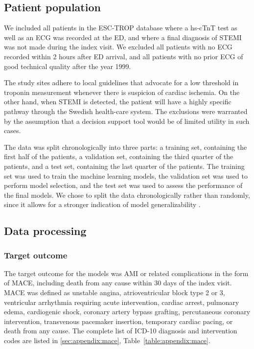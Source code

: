 \documentclass[preprint]{elsarticle}
\begin{document}
\subsection{Patient population}
We included all patients in the ESC-TROP database where a hs-cTnT test as well as an ECG was recorded at the ED, and where a final diagnosis of STEMI was not made during the index visit. We excluded all patients with no ECG recorded within 2 hours after ED arrival, and all patients with no prior ECG of good technical quality after the year 1999.

The study sites adhere to local guidelines that advocate for a low threshold in troponin measurement whenever there is suspicion of cardiac ischemia. On the other hand, when STEMI is detected, the patient will have a highly specific pathway through the Swedish health-care system. The exclusions were warranted by the assumption that a decision support tool would be of limited utility in such cases.

The data was split chronologically into three parts: a training set, containing the first half of the patients, a validation set, containing the third quarter of the patients, and a test set, containing the last quarter of the patients. The training set was used to train the machine learning models, the validation set was used to perform model selection, and the test set was used to assess the performance of the final models. We chose to split the data chronologically rather than randomly, since it allows for a stronger indication of model generalizability \citep{steyerberg2009}.


\subsection{Data processing}
\subsubsection{Target outcome}
The target outcome for the models was AMI or related complications in the form of MACE, including death from any cause within 30 days of the index visit. MACE was defined as unstable angina, atrioventricular block type 2 or 3, ventricular arrhythmia requiring acute intervention, cardiac arrest, pulmonary edema, cardiogenic shock, coronary artery bypass grafting, percutaneous coronary intervention, transvenous pacemaker insertion, temporary cardiac pacing, or death from any cause. The complete list of ICD-10 diagnosis and intervention codes are listed in \ref{sec:appendix:mace}, Table~\ref{table:appendix:mace}.
\end{document}
